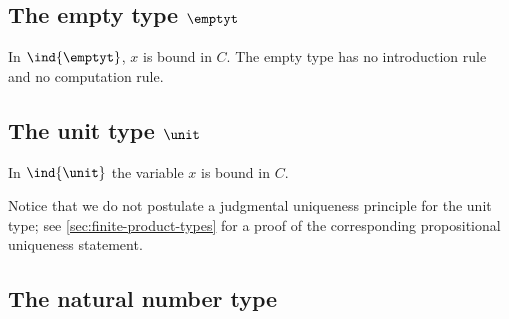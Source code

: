 \subsection{The empty type \texorpdfstring{$\emptyt$}{0}}

%

%
In $\ind{\emptyt}$, $x$ is bound in $C$. The empty type has no introduction rule and no computation rule.

%

\subsection{The unit type \texorpdfstring{$\unit$}{1}}
\label{sec:more-formal-unit}

%

%
In $\ind{\unit}$ the variable $x$ is bound in $C$.

Notice that we do not postulate a judgmental uniqueness principle for the unit
type; see \cref{sec:finite-product-types} for a proof of the corresponding
propositional uniqueness statement.

%

\subsection{The natural number type}

